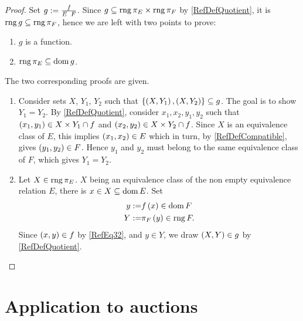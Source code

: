 \documentclass[oneside
]
{article}
\theoremstyle{plain}
\theoremstyle{definition}
\DeclareMathOperator{\rng}{rng}
\DeclareMathOperator{\dom}{dom}
\begin{document}
\begin{proof}
Set 
$
g := \quotient{f}{E}{F}
$.
Since $g \C \rng \toClass{E} \cartprod \rng \toClass{F}$ by \ref{RefDefQuotient}, it is $\rng g \C \rng \toClass{F}$, hence we are left with two points to prove:
\begin{enumerate}
\item
$ g $ is a function.
\item
$ \rng \toClass{E} \C \dom g $.
\end{enumerate}
The two corresponding proofs are given.
\begin{enumerate}
\item
Consider sets $X$, $Y_1$, $Y_2$ such that 
$ \left\{ \left( {X}, {Y_1} \right), \left( {X}, {Y_2} \right) \right\} \subseteq g$. 
The goal is to show $Y_1 = Y_2$.
By \ref{RefDefQuotient}, consider $x_1, x_2, y_1, y_2$ such that 
$\left( {x_1}, {y_1} \right) \in X \times Y_1 \cap f$ and
$\left( {x_2}, {y_2} \right) \in X \times Y_2 \cap f$.
Since $X$ is an equivalence class of $E$, this implies $\left( {x_1}, {x_2} \right) \in E$ which in turn, by \ref{RefDefCompatible}, gives $ \left( {y_1}, {y_2} \right) \in F$.
Hence $y_1$ and $y_2$ must belong to the same equivalence class of $F$, which gives $Y_1 = Y_2$.
\item
Let $X \in \rng \toClass{E}$. 
$X$ being an equivalence class of the non empty equivalence relation $E$, there is $x \in X \C \dom E$.
Set
\begin{align}
\label{RefEq32}
y := & f \left( x \right) \in \dom F
\\
\notag
Y := & \toClass{F} \left( y \right) \in \rng F.
\end{align}
Since $\left( {x}, {y} \right) \in f$ by \eqref{RefEq32}, and $y \in Y$, we draw $\left( {X}, {Y} \right) \in g$ by \ref{RefDefQuotient}.
\end{enumerate}
\end{proof}






























\section{Application to auctions}
\end{document}

